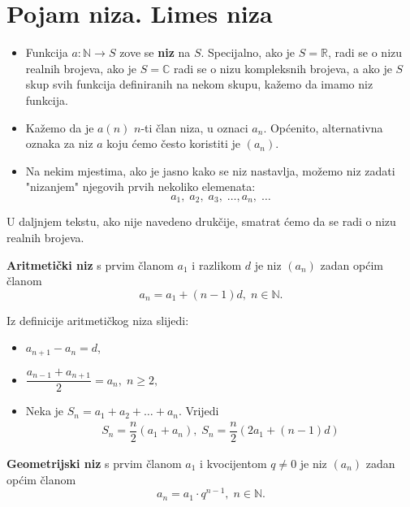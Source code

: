 \section{Pojam niza. Limes niza}
\begin{definition} \textbf{}
\begin{itemize}
\item Funkcija $a : \mathbb{N}\to S$ zove se \textbf{niz} na $S$. Specijalno, ako je $S=\mathbb{R}$, radi se o nizu realnih brojeva, ako je $S=\mathbb{C}$ radi se o nizu kompleksnih brojeva, a ako je $S$ skup svih funkcija definiranih na nekom skupu, kažemo da imamo niz funkcija.

\item Kažemo da je $a(n)$ $n$-ti član niza, u oznaci $a_n$. Općenito, alternativna oznaka za niz $a$ koju ćemo često koristiti je $(a_n)$. 

\item Na nekim mjestima, ako je jasno kako se niz nastavlja, možemo niz zadati "nizanjem" njegovih prvih nekoliko elemenata:
$$a_1,\; a_2,\; a_3,\;\dots, a_n,\; \dots $$
\end{itemize}
\end{definition}
U daljnjem tekstu, ako nije navedeno drukčije, smatrat ćemo da se radi o nizu realnih brojeva.
\begin{definition}
\textbf{Aritmetički niz} s prvim članom $a_1$ i razlikom $d$ je niz $(a_n)$ zadan općim članom
$$a_n=a_1+(n-1)d, \; n\in \mathbb{N}.$$
\end{definition}

\noindent Iz definicije aritmetičkog niza slijedi:
\begin{itemize}
\item $a_{n+1}-a_n=d$,
\item $\dfrac{a_{n-1}+a_{n+1}}{2}=a_n, \; n\geq 2,$
\item Neka je $S_n=a_1+a_2+\dots+a_n$. Vrijedi
\begin{gather}
\label{arsum}
S_n=\dfrac{n}{2}\left(a_1+a_n\right), \; S_n=\dfrac{n}{2}\left(2a_1+(n-1)d\right)
\end{gather}
\end{itemize}
\begin{definition}
\label{17}
\textbf{Geometrijski niz} s prvim članom $a_1$ i kvocijentom $q\neq 0$ je niz $(a_n)$ zadan općim članom
$$a_n=a_1\cdot q^{n-1}, \; n\in \mathbb{N}.$$
\end{definition}

